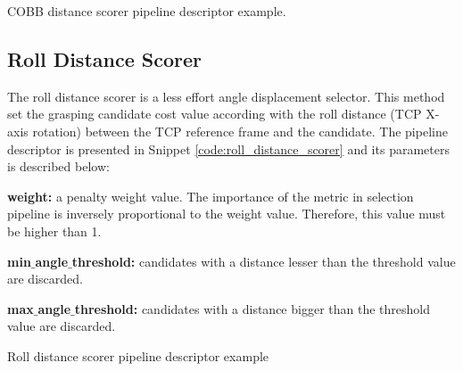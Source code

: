 \begin{snippet}[h!]
\centering
{}
\caption{\ac{COBB} distance scorer pipeline descriptor example.}
\label{code:cobb_distance_scorer}
\end{snippet}

\subsection{Roll Distance Scorer}
\label{cap4:modular_grasping_architecture:sec:grasp_selection:subsec:roll_distance}

The roll distance scorer is a less effort angle displacement selector. This method  set the grasping candidate cost value according with the roll distance (TCP X-axis rotation) between the TCP reference frame and the candidate. The pipeline descriptor is presented in Snippet \ref{code:roll_distance_scorer} and its parameters is described below:

\begin{itemize_jp}
    \item \textbf{weight:} a penalty weight value. The importance of the metric in selection pipeline is inversely proportional to the weight value. Therefore, this value must be higher than 1.
    \item \textbf{min$\_$angle$\_$threshold:} candidates with a distance lesser than the threshold value are discarded.
    \item \textbf{max$\_$angle$\_$threshold:} candidates with a distance bigger than the threshold value are discarded.
\end{itemize_jp}


\begin{snippet}[h!]
\centering
{}
\caption{Roll distance scorer pipeline descriptor example}
\label{code:roll_distance_scorer}
\end{snippet}

